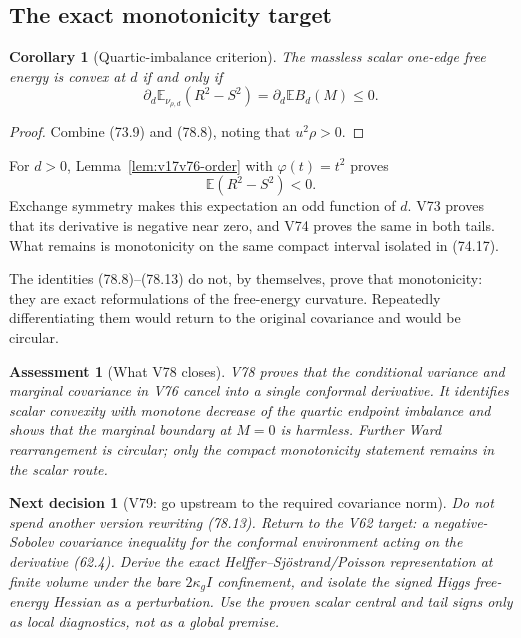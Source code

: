 \documentclass[11pt]{article}
\newtheorem{corollary}[theorem]{Corollary}
\newtheorem{decision}[theorem]{Next decision}
\newtheorem{assessment}[theorem]{Assessment}
\theoremstyle{remark}
\begin{document}
\subsection{The exact monotonicity target}

\begin{corollary}[Quartic-imbalance criterion]
\label{cor:v17v78-criterion}
The massless scalar one-edge free energy is convex at \(d\) if and
only if
\[
\boxed{
 \partial_d\mathbb E_{\nu_{\rho,d}}(R^2-S^2)
 =\partial_d\mathbb E B_d(M)\leq0.}               \tag{78.13}
\]
\end{corollary}

\begin{proof}
Combine (73.9) and (78.8), noting that \(u^2\rho>0\).
\end{proof}

For \(d>0\), Lemma~\ref{lem:v17v76-order} with
\(\varphi(t)=t^2\) proves
\[
 \mathbb E(R^2-S^2)<0.                            \tag{78.14}
\]
Exchange symmetry makes this expectation an odd function of \(d\).
V73 proves that its derivative is negative near zero, and V74 proves
the same in both tails.  What remains is monotonicity on the same
compact interval isolated in (74.17).

The identities (78.8)--(78.13) do not, by themselves, prove that
monotonicity: they are exact reformulations of the free-energy
curvature.  Repeatedly differentiating them would return to the
original covariance and would be circular.

\begin{assessment}[What V78 closes]
\label{ass:v17v78-status}
V78 proves that the conditional variance and marginal covariance in
V76 cancel into a single conformal derivative.  It identifies scalar
convexity with monotone decrease of the quartic endpoint imbalance and
shows that the marginal boundary at \(M=0\) is harmless.  Further Ward
rearrangement is circular; only the compact monotonicity statement
remains in the scalar route.
\end{assessment}

\begin{decision}[V79: go upstream to the required covariance norm]
\label{dec:v17v78-next}
Do not spend another version rewriting (78.13).  Return to the V62
target: a negative-Sobolev covariance inequality for the conformal
environment acting on the derivative (62.4).  Derive the exact
Helffer--Sj\"ostrand/Poisson representation at finite volume under the
bare \(2\kappa_gI\) confinement, and isolate the signed Higgs
free-energy Hessian as a perturbation.  Use the proven scalar central
and tail signs only as local diagnostics, not as a global premise.
\end{decision}
\end{document}
